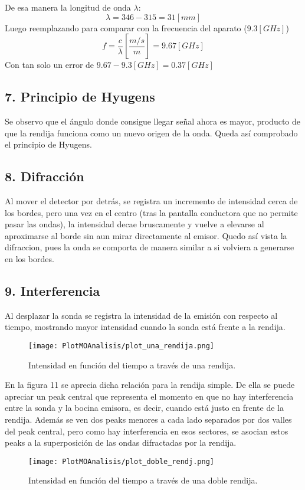 \documentclass[a4paper,twocolumn,10pt]{article}
\begin{document}
De esa manera la longitud de onda $\lambda$:
$$
\lambda = 346 - 315 = 31 [mm]
$$
Luego reemplazando para comparar con la frecuencia del aparato ($9.3 [GHz]$)
$$
f = \frac{c}{\lambda} [\frac{m/s}{m}] = 9.67 [GHz]
$$
Con tan solo un error de $9.67 - 9.3 [GHz] = 0.37 [GHz]$

\subsection*{7. Principio de Hyugens}
Se observo que el ángulo donde consigue llegar señal ahora es mayor, producto de que la rendija funciona como un nuevo origen de la onda. Queda así comprobado el principio de Hyugens.

\subsection*{8. Difracción}
Al mover el detector por detrás, se registra un incremento de intensidad cerca de los bordes, pero una vez en el centro (tras la pantalla conductora que no permite pasar las ondas), la intensidad decae bruscamente y vuelve a elevarse al aproximarse al borde sin aun mirar directamente al emisor. 
Quedo así vista la difraccion, pues la onda se comporta de manera similar a si volviera a generarse en los bordes.

\subsection*{9. Interferencia}
Al desplazar la sonda se registra la intensidad de la emisión con respecto al tiempo, mostrando mayor intensidad cuando la sonda está frente a la rendija. 
\begin{figure}[H]
    \centering
    \texttt{[image: PlotMOAnalisis/plot\_una\_rendija.png]}
    \caption{Intensidad en función del tiempo a través de una rendija.}
    \label{fig:my_label}
\end{figure}

En la figura 11 se aprecia dicha relación para la rendija simple. De ella se puede apreciar un peak  central que representa el momento en que no hay interferencia entre la sonda y la bocina emisora, es decir, cuando está justo en frente de la rendija. Además se ven dos peaks menores a cada lado separados por dos valles del peak central, pero como hay interferencia en esos sectores, se asocian estos peaks a la superposición de las ondas difractadas por la rendija.
\begin{figure}[H]
    \centering
    \texttt{[image: PlotMOAnalisis/plot\_doble\_rendj.png]}
    \caption{Intensidad en función del tiempo a través de una doble rendija.}
    \label{fig:my_label}
\end{figure}
\end{document}
